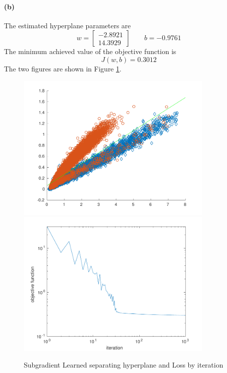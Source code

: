 \documentclass[12pt]{article}
\begin{document}
\paragraph{(b)}
The estimated hyperplane parameters are
\[ w=\begin{bmatrix} -2.8921 \\ 14.3929 \end{bmatrix} \hspace{2em} b=-0.9761 \]
The minimum achieved value of the objective function is
\[ J(w,b)=0.3012 \]
The two figures are shown in Figure \ref{hw3p4b}.
\begin{figure}[htbp]
    \centering
    \includegraphics[width=0.85\textwidth]{./hw3/problem4/hw3p4b1.pdf}
    \includegraphics[width=0.85\textwidth]{./hw3/problem4/hw3p4b2.pdf}
    \caption{Subgradient Learned separating hyperplane and Loss by iteration}
    \label{hw3p4b}
\end{figure}
\end{document}

